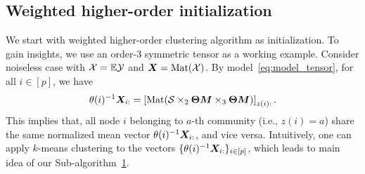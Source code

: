 \documentclass[lettersize,journal]{IEEEtran}
\theoremstyle{definition}
\theoremstyle{definition}
\newcommand{\off}[1]{\left[#1\right]}
\begin{document}
\subsection{Weighted higher-order initialization}

We start with weighted higher-order clustering algorithm as initialization. To gain insights, we use an order-3 symmetric tensor as a working example. Consider noiseless case with $\mathcal{X} = \mathbb{E}\mathcal{Y}$ and $\bm X = \text{Mat}(\mathcal{X})$. 
By model~\eqref{eq:model_tensor}, for all $i \in [p]$, we have
\begin{equation}\label{eq:kmeans}
    \theta(i)^{-1} \mX_{i:} = \off{\text{Mat}( \tS \times_2 \mTheta \mM \times_3  \mTheta \mM )}_{z(i):}. 
\end{equation}
This implies that, all node $i$ belonging to $a$-th community (i.e., $z(i)=a$) share the same normalized mean vector $\theta(i)^{-1} \bm X_{i:}$, and vice versa. Intuitively, one can apply $k$-means clustering to the vectors $\{ \theta(i)^{-1} \bm X_{i:} \}_{i\in[p]}$, which leads to main idea of our Sub-algorithm~\hyperref[alg:main]{1}.  
\end{document}

